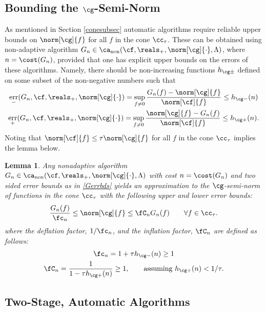 \documentclass[]{elsarticle}
\DeclareMathOperator{\fix}{non}
\DeclareMathOperator{\err}{err}
\newtheorem{lem}{Lemma}
\theoremstyle{definition}
\theoremstyle{remark}
\begin{document}
\subsection{Bounding the $\cg$-Semi-Norm}

As mentioned in Section \ref{conesubsec} automatic algorithms require reliable upper bounds on $\norm[\cg]{f}$ for all $f$ in the cone $\cc_{\tau}$. These can be obtained using non-adaptive algorithm $G_n \in \ca_{\fix}(\cf,\reals_+,\norm[\cg]{\cdot},\Lambda)$, where $n=\cost(G_n)$, provided that one has explicit upper bounds on the errors of these algorithms.  Namely, there should be non-increasing functions $h_{\cg\pm}$ defined on some subset of the non-negative numbers such that
\begin{subequations}\label{Gerrbds}
\begin{gather}
\err_{-}(G_n,\cf,\reals_{+},\norm[\cg]{\cdot}) = \sup_{f \ne 0} \frac{G_n(f)-\norm[\cg]{f}}{\norm[\cf]{f}} \le h_{\cg -}(n) \\
\err_{+}(G_n,\cf,\reals_{+},\norm[\cg]{\cdot}) = \sup_{f \ne 0} \frac{\norm[\cg]{f}-G_n(f)}{\norm[\cf]{f}} \le h_{\cg +}(n).
\end{gather}
\end{subequations}
Noting that $\norm[\cf]{f} \le \tau \norm[\cg]{f}$ for all $f$ in the cone $\cc_{\tau}$ implies the lemma below. 

\begin{lem} \label{Gnormlem} Any nonadaptive algorithm $G_n \in \ca_{\fix}(\cf,\reals_+,\norm[\cg]{\cdot},\Lambda)$ with cost $n=\cost(G_n)$ and two sided error bounds as in \eqref{Gerrbds} yields an approximation to the $\cg$-semi-norm of functions in the cone $\cc_{\tau}$ with the following upper and lower error bounds:
\begin{equation} \label{twosidedGineq}
\frac{G_n(f)}{\fc_n} \le \norm[\cg]{f} \le \fC_n G_n(f) \qquad \forall f \in \cc_{\tau}.
\end{equation}
where the deflation factor, $1/\fc_n$, and the inflation factor, $\fC_n$ are defined as follows:
\begin{gather} \label{normdeflate}
\fc_n =1 + \tau h_{\cg -}(n)  \ge 1 \\
\label{norminflate}
\fC_n =\frac{1}{1 - \tau h_{\cg +}(n)} \ge 1, \qquad \text{assuming } h_{\cg +}(n) < 1/\tau.
\end{gather}
\end{lem}

\subsection{Two-Stage, Automatic Algorithms}
\end{document}
